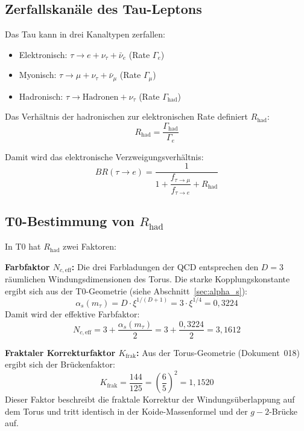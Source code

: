 	\subsection{Zerfallskanäle des Tau-Leptons}
	
	Das Tau kann in drei Kanaltypen zerfallen:
	\begin{itemize}
		\item Elektronisch: $\tau \to e + \nu_\tau + \bar\nu_e$ (Rate $\Gamma_e$)
		\item Myonisch: $\tau \to \mu + \nu_\tau + \bar\nu_\mu$ (Rate $\Gamma_\mu$)
		\item Hadronisch: $\tau \to \text{Hadronen} + \nu_\tau$ (Rate $\Gamma_\text{had}$)
	\end{itemize}
	
	Das Verhältnis der hadronischen zur elektronischen Rate definiert $R_\text{had}$:
	\begin{equation}
		R_\text{had} = \frac{\Gamma_\text{had}}{\Gamma_e}
	\end{equation}
	
	Damit wird das elektronische Verzweigungsverhältnis:
	\begin{equation}
		BR(\tau \to e) = \frac{1}{1 + \dfrac{f_{\tau \to \mu}}{f_{\tau \to e}} + R_\text{had}}
		\label{eq:br}
	\end{equation}
	
	\subsection{T0-Bestimmung von $R_\text{had}$}
	
	In T0 hat $R_\text{had}$ zwei Faktoren:
	
	\textbf{Farbfaktor $N_{c,\text{eff}}$:} Die drei Farbladungen der QCD entsprechen den $D = 3$ räumlichen Windungsdimensionen des Torus. Die starke Kopplungskonstante ergibt sich aus der T0-Geometrie (siehe Abschnitt~\ref{sec:alpha_s}):
	\begin{equation}
		\alpha_s(m_\tau) = D \cdot \xi^{1/(D+1)} = 3 \cdot \xi^{1/4} = 0{,}3224
	\end{equation}
	Damit wird der effektive Farbfaktor:
	\begin{equation}
		N_{c,\text{eff}} = 3 + \frac{\alpha_s(m_\tau)}{2} = 3 + \frac{0{,}3224}{2} = 3{,}1612
	\end{equation}
	
	\textbf{Fraktaler Korrekturfaktor $K_\text{frak}$:} Aus der Torus-Geometrie (Dokument~018) ergibt sich der Brückenfaktor:
	\begin{equation}
		K_\text{frak} = \frac{144}{125} = \left(\frac{6}{5}\right)^2 = 1{,}1520
	\end{equation}
	Dieser Faktor beschreibt die fraktale Korrektur der Windungsüberlappung auf dem Torus und tritt identisch in der Koide-Massenformel und der $g-2$-Brücke auf.
	
